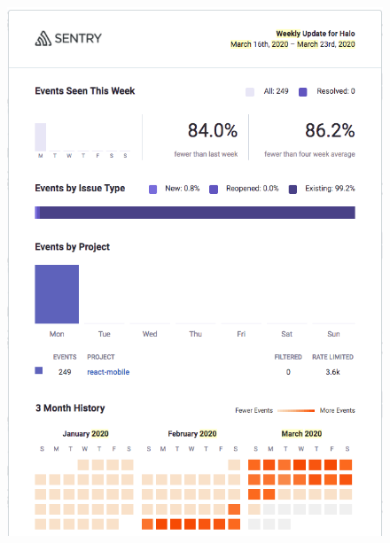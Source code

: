\begin{figure}[htbp!]
\RawFloats %
\centering
\begin{minipage}{.45\textwidth}
  \centering
  \includegraphics[width=\textwidth]{images/localhalo/sentry-weekly-report-16-mar-2020.png}
  \label{fig:localhalo-sentry-weekly-report-16-mar-2020}
\end{minipage}\hfill%
\begin{minipage}{.45\textwidth}
  \centering

\end{minipage}
\end{figure}

